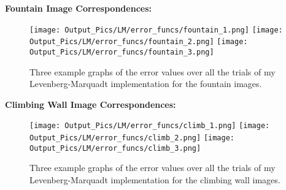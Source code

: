 \documentclass{article}
\begin{document}
\textbf{Fountain Image Correspondences:}
\begin{figure}[H]
    \centering
    \texttt{[image: Output\_Pics/LM/error\_funcs/fountain\_1.png]}
    \texttt{[image: Output\_Pics/LM/error\_funcs/fountain\_2.png]}
    \texttt{[image: Output\_Pics/LM/error\_funcs/fountain\_3.png]}
    \caption{Three example graphs of the error values over all the trials of my Levenberg-Marquadt implementation for the fountain images.}
\end{figure}

\textbf{Climbing Wall Image Correspondences:}
\begin{figure}[H]
    \centering
    \texttt{[image: Output\_Pics/LM/error\_funcs/climb\_1.png]}
    \texttt{[image: Output\_Pics/LM/error\_funcs/climb\_2.png]}
    \texttt{[image: Output\_Pics/LM/error\_funcs/climb\_3.png]}
    \caption{Three example graphs of the error values over all the trials of my Levenberg-Marquadt implementation for the climbing wall images.}
\end{figure}
\end{document}
